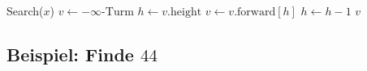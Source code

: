 \documentclass{scrartcl}%
\begin{document}
    \begin{algorithm}
        \begin{algorithmic}
            \STATE Search($x$)
            \bindent
            \STATE $v\gets -\infty\text{-Turm}$
            \STATE $h\gets v.\text{height}$
            \STATE
                    \STATE $v\gets v.\text{forward}[h]$
                \ENDWHILE
                \STATE $h\gets h-1$
            \ENDWHILE
            \STATE
            \RETURN $v$
            \eindent

        \end{algorithmic}
    \end{algorithm}

    \subsection*{Beispiel: Finde $44$}\label{subsec:beispiel:Finde}
\end{document}
